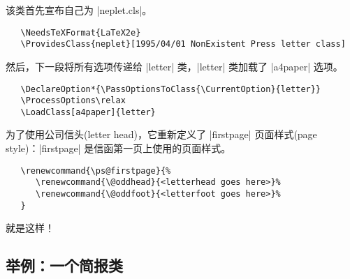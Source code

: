 \documentclass{ltxguide}[1995/11/28]
\begin{document}
该类首先宣布自己为 |neplet.cls|。
\begin{verbatim}
   \NeedsTeXFormat{LaTeX2e}
   \ProvidesClass{neplet}[1995/04/01 NonExistent Press letter class]
\end{verbatim}
然后，下一段将所有选项传递给 |letter| 类，|letter| 类加载了 |a4paper| 选项。
\begin{verbatim}
   \DeclareOption*{\PassOptionsToClass{\CurrentOption}{letter}}
   \ProcessOptions\relax
   \LoadClass[a4paper]{letter}
\end{verbatim}
为了使用公司信头(letter head)，它重新定义了 |firstpage| 页面样式(page style)：|firstpage| 是信函第一页上使用的页面样式。
\begin{verbatim}
   \renewcommand{\ps@firstpage}{%
      \renewcommand{\@oddhead}{<letterhead goes here>}%
      \renewcommand{\@oddfoot}{<letterfoot goes here>}%
   }
\end{verbatim}
就是这样！

\subsection[举例：一个简报类]{\heiti 举例：一个简报类}
\end{document}
